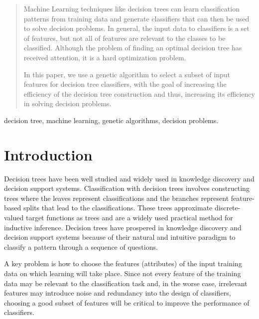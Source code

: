 \documentclass[conference]{IEEEtran}
\begin{document}
\maketitle


\begin{abstract}
Machine Learning techniques like decision trees can learn classification patterns  from training data and generate classifiers that can then be used to solve decision problems. In general, the input data to classifiers is a set of features, but not all of features are relevant to the classes to be classified. Although the problem of finding an optimal decision tree has received attention, it is a hard  optimization problem.


In this paper, we use a genetic algorithm to select a subset of input features for decision tree classifiers, with the goal of increasing the efficiency of the decision tree construction and thus, increasing its efficiency in solving decision problems.
\end{abstract}
\begin{keywords}
decision tree, machine learning, genetic algorithms, decision problems.
\end{keywords}

\IEEEpeerreviewmaketitle



\section{Introduction}
Decision trees have been well studied and widely used in knowledge discovery and decision support systems. Classification with decision trees involves constructing trees where the leaves represent classifications and the branches represent feature-based splits that lead to the classifications. These trees approximate discrete-valued target functions as trees and are a widely used practical method for inductive inference. Decision trees have prospered in knowledge discovery and decision support systems because of their natural and intuitive paradigm to classify a pattern through a sequence of questions. 


 A key problem is how to choose the features (attributes) of the input training data on which
learning will take place. Since not every feature of the training  data may be relevant to the classification task and, in the worse case, irrelevant features may introduce noise and redundancy into the design of classifiers, choosing a good subset of features will be critical to improve the performance of classifiers. 
\end{document}
